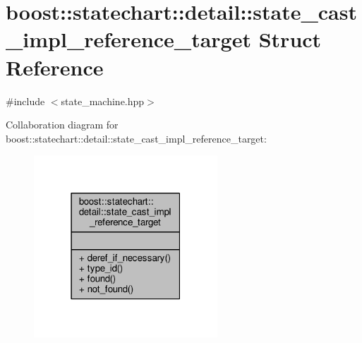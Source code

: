 \hypertarget{structboost_1_1statechart_1_1detail_1_1state__cast__impl__reference__target}{}\section{boost\+:\+:statechart\+:\+:detail\+:\+:state\+\_\+cast\+\_\+impl\+\_\+reference\+\_\+target Struct Reference}
\label{structboost_1_1statechart_1_1detail_1_1state__cast__impl__reference__target}


{\ttfamily \#include $<$state\+\_\+machine.\+hpp$>$}



Collaboration diagram for boost\+:\+:statechart\+:\+:detail\+:\+:state\+\_\+cast\+\_\+impl\+\_\+reference\+\_\+target\+:
\nopagebreak
\begin{figure}[H]
\begin{center}
\leavevmode
\includegraphics[width=195pt]{structboost_1_1statechart_1_1detail_1_1state__cast__impl__reference__target__coll__graph}
\end{center}
\end{figure}
